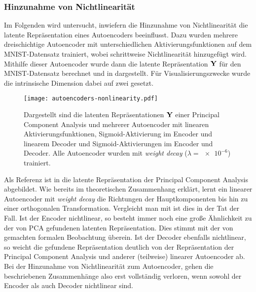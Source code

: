 \subsubsection{Hinzunahme von Nichtlinearität}

Im Folgenden wird untersucht, inwiefern die Hinzunahme von Nichtlinearität die latente
Repräsentation eines Autoencoders beeinflusst. Dazu wurden mehrere dreischichtige Autoencoder mit
unterschiedlichen Aktivierungsfunktionen auf dem MNIST-Datensatz trainiert, wobei schrittweise
Nichtlinearität hinzugefügt wird. Mithilfe dieser Autoencoder wurde dann die latente Repräsentation
$\mathbf{Y}$ für den MNIST-Datensatz berechnet und in 
dargestellt. Für Visualisierungszwecke wurde die intrinsische Dimension dabei auf zwei gesetzt.
\begin{figure}[ht]
	\centering
	\texttt{[image: autoencoders-nonlinearity.pdf]}
	\caption[Latente Repräsentationen von PCA und drei Autoencoder mit unterschiedlichen Aktivierungsfunktionen]{Dargestellt sind die latenten Repräsentationen $\mathbf{Y}$ einer \captiona Principal Component Analysis und mehrerer Autoencoder mit \captionb linearen Aktivierungsfunktionen, \captionc Sigmoid-Aktivierung im Encoder und linearem Decoder und \captiond Sigmoid-Aktivierungen im Encoder und Decoder. Alle Autoencoder wurden mit \textit{weight decay} ($\lambda = \num{e-6}$) trainiert.}
	\label{fig:Autoencoder-Nichtlinearitaet}
\end{figure}
Als Referenz ist in \captiona die latente Repräsentation der Principal Component Analysis abgebildet. Wie bereits im theoretischen Zusammenhang erklärt, lernt ein linearer Autoencoder mit \textit{weight decay} die Richtungen der Hauptkomponenten bis hin zu einer orthogonalen Transformation. Vergleicht man  \captiona mit \captionb ist dies in der Tat der Fall. Ist der Encoder nichtlinear, so besteht immer noch eine große Ähnlichkeit zu der von PCA gefundenen latenten Repräsentation. Dies stimmt mit der von \textcite{Bourlard.1988} gemachten formalen Beobachtung überein. Ist der Decoder ebenfalls nichtlinear, so weicht die gefundene Repräsentation deutlich von der Repräsentation der Principal Component Analysis und anderer (teilweise) linearer Autoencoder ab. Bei der Hinzunahme von Nichtlinearität zum Autoencoder, gehen die beschriebenen Zusammenhänge also erst vollständig verloren, wenn sowohl der Encoder als auch Decoder nichtlinear sind.
